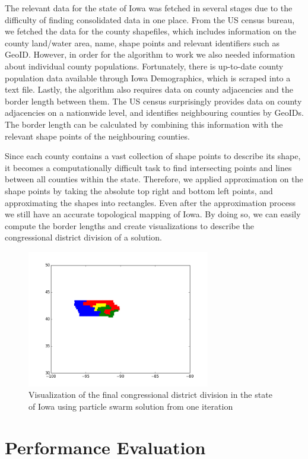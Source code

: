 \documentclass[journal]{IEEEtran}
\begin{document}
The relevant data for the state of Iowa was fetched in several stages due to
the difficulty of finding consolidated data in one place. From the US census
bureau, we fetched the data for the county shapefiles, which includes
information on the county land/water area, name, shape points and relevant
identifiers such as GeoID. However, in order for the algorithm to work we
also needed information about individual county populations. Fortunately,
there is up-to-date county population data available through Iowa
Demographics\cite{iowa}, which is scraped into a text file. Lastly, the algorithm
also requires data on county adjacencies and the border length between them.
The US census surprisingly provides data on county adjacencies on a nationwide
level\cite{census}, and identifies neighbouring counties by GeoIDs. The border length
can be calculated by combining this information with the relevant shape points
of the neighbouring counties.

Since each county contains a vast collection of shape points to describe its
shape, it becomes a computationally difficult task to find intersecting points
and lines between all counties within the state. Therefore, we applied
approximation on the shape points by taking the absolute top right and bottom
left points, and approximating the shapes into rectangles. Even after the
approximation process we still have an accurate topological mapping of Iowa.
By doing so, we can easily compute the border lengths and create visualizations
to describe the congressional district division of a solution.

\begin{figure}[h!]
    \includegraphics[width=8cm]{iowa.png}
    \centering
    \caption{Visualization of the final congressional district division in the
        state of Iowa using particle swarm solution from one iteration}
    \label{fig:iowa}
\end{figure}

\section{Performance Evaluation}
\end{document}
